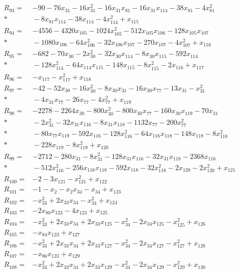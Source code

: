 \begin{align*}
R_{93}={}&-90-76x_{31}-16x_{31}^{2}-16x_{31}x_{81}-16x_{31}x_{114}-38x_{81}-4x_{81}^{2}\\*
&{}-8x_{81}x_{114}-38x_{114}-4x_{114}^{2}+x_{115}\\[3pt]
R_{94}={}&-4556-4320x_{105}-1024x_{105}^{2}-512x_{105}x_{106}-128x_{105}x_{107}\\*
&{}-1080x_{106}-64x_{106}^{2}-32x_{106}x_{107}-270x_{107}-4x_{107}^{2}+x_{116}\\[3pt]
R_{95}={}&-682-70x_{30}-2x_{30}^{2}-32x_{30}x_{114}-8x_{30}x_{115}-592x_{114}\\*
&{}-128x_{114}^{2}-64x_{114}x_{115}-148x_{115}-8x_{115}^{2}-2x_{116}+x_{117}\\[3pt]
R_{96}={}&-x_{117}-x_{117}^{2}+x_{118}\\[3pt]
R_{97}={}&-42-52x_{30}-16x_{30}^{2}-8x_{30}x_{31}-16x_{30}x_{77}-13x_{31}-x_{31}^{2}\\*
&{}-4x_{31}x_{77}-26x_{77}-4x_{77}^{2}+x_{119}\\[3pt]
R_{98}={}&-2278-2264x_{30}-800x_{30}^{2}-800x_{30}x_{77}-160x_{30}x_{119}-70x_{31}\\*
&{}-2x_{31}^{2}-32x_{31}x_{116}-8x_{31}x_{118}-1132x_{77}-200x_{77}^{2}\\*
&{}-80x_{77}x_{119}-592x_{116}-128x_{116}^{2}-64x_{116}x_{118}-148x_{118}-8x_{118}^{2}\\*
&{}-228x_{119}-8x_{119}^{2}+x_{120}\\[3pt]
R_{99}={}&-2712-280x_{31}-8x_{31}^{2}-128x_{31}x_{116}-32x_{31}x_{118}-2368x_{116}\\*
&{}-512x_{116}^{2}-256x_{116}x_{118}-592x_{118}-32x_{118}^{2}-2x_{120}-2x_{120}^{2}+x_{121}\\[3pt]
R_{100}={}&-2-3x_{121}-x_{121}^{2}+x_{122}\\[3pt]
R_{101}={}&-1-x_{2}-x_{2}x_{34}-x_{34}+x_{123}\\[3pt]
R_{102}={}&-x_{33}^{2}+2x_{33}x_{34}-x_{34}^{2}+x_{124}\\[3pt]
R_{103}={}&-2x_{80}x_{123}-4x_{123}+x_{125}\\[3pt]
R_{104}={}&-x_{33}^{2}+2x_{33}x_{34}+2x_{33}x_{125}-x_{34}^{2}-2x_{34}x_{125}-x_{125}^{2}+x_{126}\\[3pt]
R_{105}={}&-x_{84}x_{123}+x_{127}\\[3pt]
R_{106}={}&-x_{33}^{2}+2x_{33}x_{34}+2x_{33}x_{127}-x_{34}^{2}-2x_{34}x_{127}-x_{127}^{2}+x_{128}\\[3pt]
R_{107}={}&-x_{86}x_{123}+x_{129}\\[3pt]
R_{108}={}&-x_{33}^{2}+2x_{33}x_{34}+2x_{33}x_{129}-x_{34}^{2}-2x_{34}x_{129}-x_{129}^{2}+x_{130}\\[3pt]

\end{align*}

